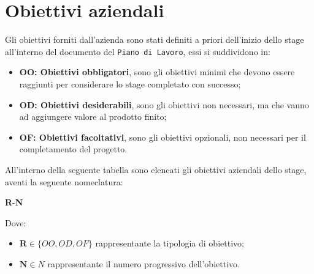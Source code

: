 \pagebreak
\section{Obiettivi aziendali}
\label{sez:obiettivi-aziendali}

Gli obiettivi forniti dall'azienda sono stati definiti a priori dell'inizio dello stage all'interno del documento del \texttt{Piano di Lavoro}, essi si suddividono in:
\begin{itemize}
    \item \textbf{OO: Obiettivi obbligatori}, sono gli obiettivi minimi che devono essere raggiunti per considerare lo stage completato con successo;
    \item \textbf{OD: Obiettivi desiderabili}, sono gli obiettivi non necessari, ma che vanno ad aggiungere valore al prodotto finito;
    \item \textbf{OF: Obiettivi facoltativi}, sono gli obiettivi opzionali, non necessari per il completamento del progetto.
\end{itemize}

\noindent All'interno della seguente tabella sono elencati gli obiettivi aziendali dello stage, aventi la seguente nomeclatura:

\begin{center}
    \textbf{R}-\textbf{N}
\end{center}

Dove:
\begin{itemize}
    \item $\textbf{R} \in  \{OO, OD, OF\}$ rappresentante la tipologia di obiettivo; \\
    \item $\textbf{N} \in N$ rappresentante il numero progressivo dell'obiettivo.
\end{itemize}


\renewcommand{\arraystretch}{1.5} %

